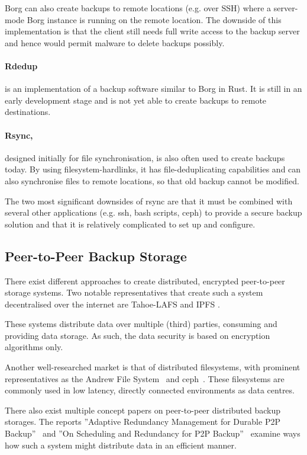 Borg can also create backups to remote locations (e.g. over SSH) where a server-mode Borg instance is running on the remote location. The downside of this implementation is that the client still needs full write access to the backup server and hence would permit malware to delete backups possibly.

\paragraph{Rdedup} \cite{rdedup} is an implementation of a backup software similar to Borg in Rust. It is still in an early development stage and is not yet able to create backups to remote destinations.

\paragraph{Rsync,} \cite{rsync} designed initially for file synchronisation, is also often used to create backups today. By using filesystem-hardlinks, it has file-deduplicating capabilities and can also synchronise files to remote locations, so that old backup cannot be modified.

The two most significant downsides of rsync are that it must be combined with several other applications (e.g. ssh, bash scripts, ceph) to provide a secure backup solution and that it is relatively complicated to set up and configure.

\subsection{Peer-to-Peer Backup Storage}
There exist different approaches to create distributed, encrypted peer-to-peer storage systems. Two notable representatives that create such a system decentralised over the internet are Tahoe-LAFS \cite{tahoe-lafs} and IPFS \cite{ipfs}.

These systems distribute data over multiple (third) parties, consuming and providing data storage. As such, the data security is based on encryption algorithms only.

Another well-researched market is that of distributed filesystems, with prominent representatives as the Andrew File System~\cite{afs} and ceph~\cite{ceph}. These filesystems are commonly used in low latency, directly connected environments as data centres.

There also exist multiple concept papers on peer-to-peer distributed backup storages. The reports ''Adaptive Redundancy Management for Durable P2P
Backup''~\cite{p2p-redundancy} and ''On Scheduling and Redundancy for P2P Backup''~\cite{p2p-scheduling} examine ways how such a system might distribute data in an efficient manner.

